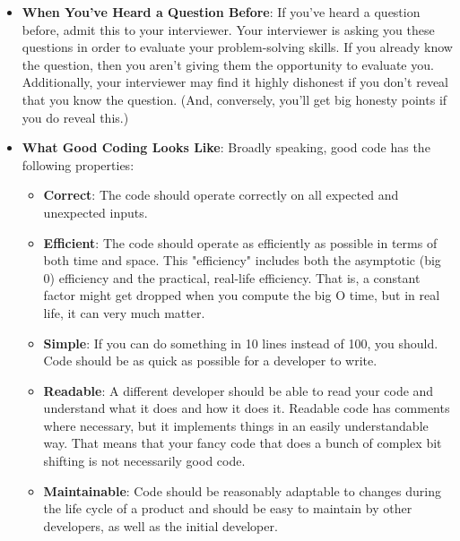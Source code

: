 \documentclass{report}
\begin{document}
\begin{itemize}
            \bigbreak \noindent 
            Third, many-possibly most-questions are too difficult to expect even a strong candidate to immediately spit out the optimal algorithm. The questions I tend to ask would take strong candidates typically 20 to 30 minutes to solve.
            \bigbreak \noindent 
            In evaluating thousands of hiring packets at Google, I have only once seen a candidate have a "flawless" set of interviews. Everyone else, including the hundreds who got offers, made mistakes.
        \item \textbf{When You've Heard a Question Before}: If you've heard a question before, admit this to your interviewer. Your interviewer is asking you these questions in order to evaluate your problem-solving skills. If you already know the question, then you aren't giving them the opportunity to evaluate you.
            \bigbreak \noindent 
            Additionally, your interviewer may find it highly dishonest if you don't reveal that you know the question. (And, conversely, you'll get big honesty points if you do reveal this.)
        \item \textbf{What Good Coding Looks Like}: Broadly speaking, good code has the following properties:
            \begin{itemize}
                \item \textbf{Correct}: The code should operate correctly on all expected and unexpected inputs.
                \item \textbf{Efficient}: The code should operate as efficiently as possible in terms of both time and space. This "efficiency" includes both the asymptotic (big 0) efficiency and the practical, real-life efficiency. That is, a constant factor might get dropped when you compute the big O time, but in real life, it can very much matter.
                \item \textbf{Simple}: If you can do something in 10 lines instead of 100, you should. Code should be as quick as possible for a developer to write.
                \item \textbf{Readable}: A different developer should be able to read your code and understand what it does and how it does it. Readable code has comments where necessary, but it implements things in an easily understandable way. That means that your fancy code that does a bunch of complex bit shifting is not necessarily good code.
                \item \textbf{Maintainable}: Code should be reasonably adaptable to changes during the life cycle of a product and should be easy to maintain by other developers, as well as the initial developer.

\end{itemize}
\end{itemize}
\end{document}
